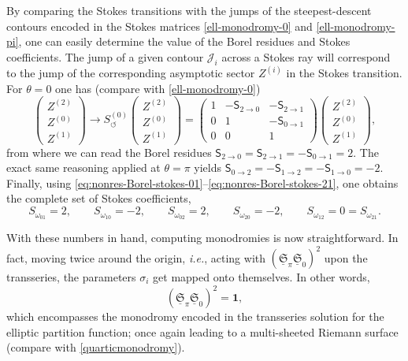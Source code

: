 \documentclass[11pt,a4paper]{article}
\newcommand{\be}{\begin{equation}}
\newcommand{\ee}{\end{equation}}
\begin{document}
By comparing the Stokes transitions with the jumps of the steepest-descent contours encoded in the Stokes matrices \eqref{ell-monodromy-0} and \eqref{ell-monodromy-pi}, one can easily determine the value of the Borel residues and Stokes coefficients. The jump of a given contour $\mathcal{J}_i$ across a Stokes ray will correspond to the jump of the corresponding asymptotic sector $Z^{(i)}$ in the Stokes transition. For $\theta=0$ one has (compare with \eqref{ell-monodromy-0})
%
\begin{equation}
\left(
\begin{array}{ccc}
Z^{(2)} \\
Z^{(0)} \\
Z^{(1)}
\end{array}
\right) \to S_{\circlearrowleft}^{(0)} \left(
\begin{array}{ccc}
Z^{(2)} \\
Z^{(0)} \\
Z^{(1)}
\end{array}
\right) = \left(
\begin{array}{ccc}
1 & -\mathsf{S}_{2\to 0} & - \mathsf{S}_{2\to 1} \\
0 & 1 & -\mathsf{S}_{0\to 1} \\
0 & 0 & 1
\end{array}
\right) \left(
\begin{array}{ccc}
Z^{(2)} \\
Z^{(0)} \\
Z^{(1)}
\end{array}
\right),
\end{equation}
%
\noindent
from where we can read the Borel residues $\mathsf{S}_{2\to 0} = \mathsf{S}_{2\to 1} = -\mathsf{S}_{0\to 1} = 2$. The exact same reasoning applied at $\theta=\pi$ yields $\mathsf{S}_{0\to 2} = -\mathsf{S}_{1\to 2} = -\mathsf{S}_{1\to 0} = -2$. Finally, using \eqref{eq:nonres-Borel-stokes-01}--\eqref{eq:nonres-Borel-stokes-21}, one obtains the complete set of Stokes coefficients,
%
\be
S_{\omega_{01}} = 2, 
\qquad 
S_{\omega_{10}} = -2, 
\qquad
S_{\omega_{02}} = 2, 
\qquad
S_{\omega_{20}} = -2, 
\qquad
S_{\omega_{12}} = 0 = S_{\omega_{21}}.
\label{eq:linear-stokes}
\ee

With these numbers in hand, computing monodromies is now straightforward. In fact, moving twice around the origin, \textit{i.e.}, acting with $\left( \underline{\mathfrak{S}}_{\pi} \underline{\mathfrak{S}}_0 \right)^2$ upon the transseries, the parameters $\sigma_i$ get mapped onto themselves. In other words,
%
\be
\left( \underline{\mathfrak{S}}_{\pi} \underline{\mathfrak{S}}_0 \right)^2 = \boldsymbol{1},
\ee
%
\noindent
which encompasses the monodromy encoded in the transseries solution for the elliptic partition function; once again leading to a multi-sheeted Riemann surface (compare with \eqref{quarticmonodromy}).
\end{document}
